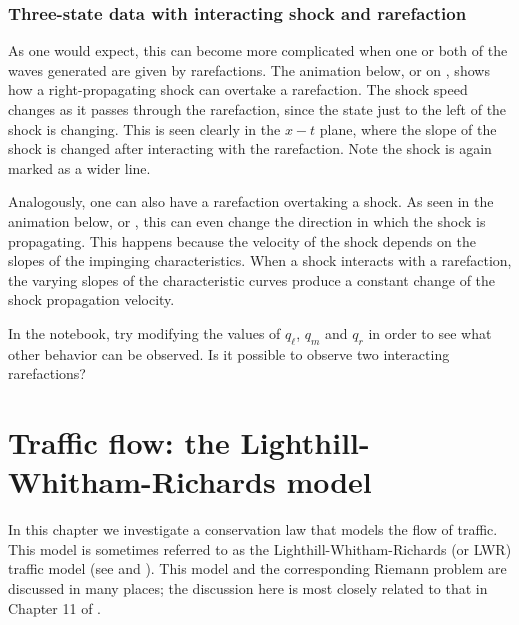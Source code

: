 \documentclass{SIAMbook2016}
\begin{document}
\hypertarget{three-state-data-with-interacting-shock-and-rarefaction}{%
\subsection{Three-state data with interacting shock and
rarefaction}\label{three-state-data-with-interacting-shock-and-rarefaction}}

As one would expect, this can become more complicated when one or both
of the waves generated are given by rarefactions. The animation below,
or on
, shows how a right-propagating shock can overtake a
rarefaction. The shock speed changes as it passes through the
rarefaction, since the state just to the left of the shock is changing.
This is seen clearly in the \(x-t\) plane, where the slope of the shock
is changed after interacting with the rarefaction. Note the shock is
again marked as a wider line.

Analogously, one can also have a rarefaction overtaking a shock. As seen
in the animation below, or
, this can even change the direction in which the shock is
propagating. This happens because the velocity of the shock depends on
the slopes of the impinging characteristics. When a shock interacts with
a rarefaction, the varying slopes of the characteristic curves produce a
constant change of the shock propagation velocity.

In the notebook, try modifying the values of \(q_\ell\), \(q_m\) and
\(q_r\) in order to see what other behavior can be observed. Is it
possible to observe two interacting rarefactions?

\hypertarget{traffic-flow-the-lighthill-whitham-richards-model}{%
\chapter{Traffic flow: the Lighthill-Whitham-Richards
model}\label{traffic-flow-the-lighthill-whitham-richards-model}}
\label{sec:05-Traffic_flow}
In this chapter we investigate a conservation law that models the flow
of traffic. This model is sometimes referred to as the
Lighthill-Whitham-Richards (or LWR) traffic model (see
\cite{lighthill1955kinematic} and \cite{richards1956shock}). This model
and the corresponding Riemann problem are discussed in many places; the
discussion here is most closely related to that in Chapter 11 of
\cite{fvmhp}.
\end{document}
